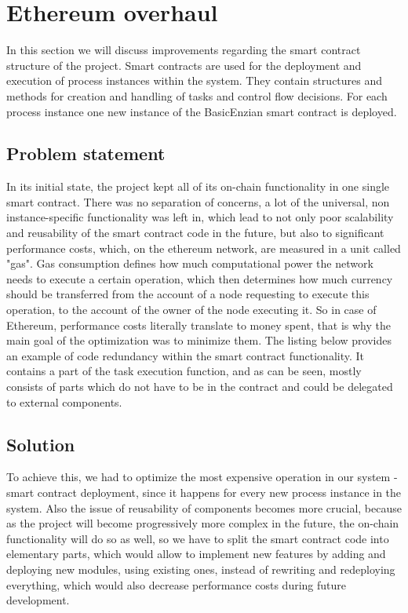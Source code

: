 %
\section{Ethereum overhaul}
\label{sec:impr:eth}

In this section we will discuss improvements regarding the smart contract structure of the project. Smart contracts are used for the deployment and execution of process instances within the system. They contain structures and methods for creation and handling of tasks and control flow decisions. For each process instance one new instance of the BasicEnzian smart contract is deployed.

\subsection{Problem statement}
\label{sec:impr:eth:problem}

In its initial state, the project kept all of its on-chain functionality in one single smart contract. There was no separation of concerns, a lot of the universal, non instance-specific functionality was left in, which lead to not only poor scalability and reusability of the smart contract code in the future, but also to significant performance costs, which, on the ethereum network, are measured in a unit called "gas". Gas consumption defines how much computational power the network needs to execute a certain operation, which then determines how much currency should be transferred from the account of a node requesting to execute this operation, to the account of the owner of the node executing it. So in case of Ethereum, performance costs literally translate to money spent, that is why the main goal of the optimization was to minimize them. The listing below provides an example of code redundancy within the smart contract functionality. It contains a part of the task execution function, and as can be seen, mostly consists of parts which do not have to be in the contract and could be delegated to external components.

 

\subsection{Solution}
\label{sec:impr:eth:solution}

To achieve this, we had to optimize the most expensive operation in our system - smart contract deployment, since it happens for every new process instance in the system. Also the issue of reusability of components becomes more crucial, because as the project will become progressively more complex in the future, the on-chain functionality will do so as well, so we have to split the smart contract code into elementary parts, which would allow to implement new features by adding and deploying new modules, using existing ones, instead of rewriting and redeploying everything, which would also decrease performance costs during future development.\\

